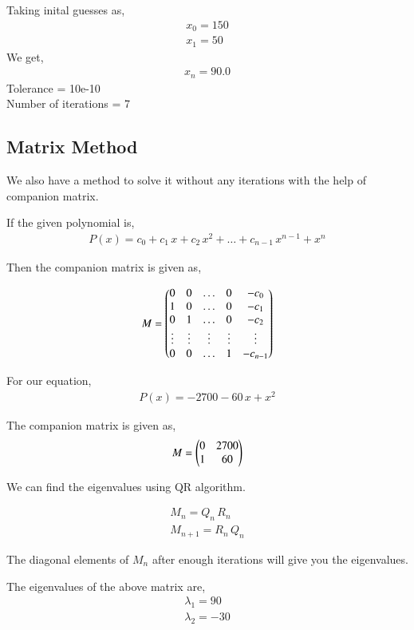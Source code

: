 \documentclass[journal]{IEEEtran}
\begin{document}
    Taking inital guesses as,
    \begin{align}
        x_0 = 150\\
        x_1 = 50
    \end{align}
    We get,
    \begin{align}
        x_n = 90.0
    \end{align}
    Tolerance = 10e-10\\
    Number of iterations = 7

\subsection{Matrix Method}
We also have a method to solve it without any iterations with the help of companion matrix.

If the given polynomial is,
\begin{align}
	P(x) = c_0 + c_1\,x + c_2\,x^2 + \dots + c_{n-1}\,x^{n-1} + x^n
\end{align}

Then the companion matrix is given as,

\begin{align}
	M = \begin{pmatrix}0 & 0 & \dots & 0 & -c_0\\1 & 0 & \dots & 0 & -c_1\\0 & 1 & \dots & 0 & -c_2\\\vdots & \vdots & \vdots & \vdots &\vdots \\0 & 0 & \dots & 1 & -c_{n-1}\end{pmatrix}
\end{align}

For our equation,
\begin{align}
    P(x) = -2700 - 60\,x + x^2
\end{align}

The companion matrix is given as,
\begin{align}
    M = \begin{pmatrix}0 & 2700\\1 & 60\end{pmatrix}
\end{align}

We can find the eigenvalues using QR algorithm.

\begin{align}
    M_n = Q_n\,R_n\\
    M_{n+1} = R_n\,Q_n
\end{align}

The diagonal elements of $M_n$ after enough iterations will give you the eigenvalues.

The eigenvalues of the above matrix are,
\begin{align}
    \lambda_1 = 90\\
    \lambda_2 = -30
\end{align}
\end{document}
